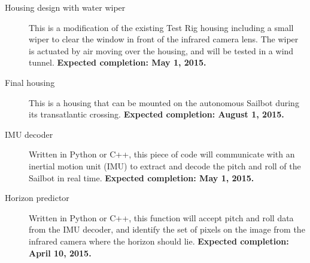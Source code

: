 
\iffalse
Guideline:
Ongoing commitments by team members.
This section explicitly states any ongoing commitments that the team members have made to the project after submitting the final report. This list is expected to be made in consultation with the Project Sponsor. It is desirable to make the items in this section as specific as possible, and to include a target end-date for the commitment.

Commitment notes:
Riley: final housing design, wind tunnel testing of wiper [End of April]
Kiel: join the team, IMU processing software (map imu data to pitch and roll, find gravity to zero-out gyro) [End of April for IMU]
\fi

\begin{description}
\item[Housing design with water wiper] This is a modification of the existing Test Rig housing including a small wiper to clear the window in front of the infrared camera lens. The wiper is actuated by air moving over the housing, and will be tested in a wind tunnel. \textbf{Expected completion: May 1, 2015.}
\item[Final housing] This is a housing that can be mounted on the autonomous Sailbot during its transatlantic crossing. \textbf{Expected completion: August 1, 2015.}
\item[IMU decoder] Written in Python or C++, this piece of code will communicate with an inertial motion unit (IMU) to extract and decode the pitch and roll of the Sailbot in real time. \textbf{Expected completion: May 1, 2015.}
\item[Horizon predictor] Written in Python or C++, this function will accept pitch and roll data from the IMU decoder, and identify the set of pixels on the image from the infrared camera where the horizon should lie. \textbf{Expected completion: April 10, 2015.}
\end{description}
